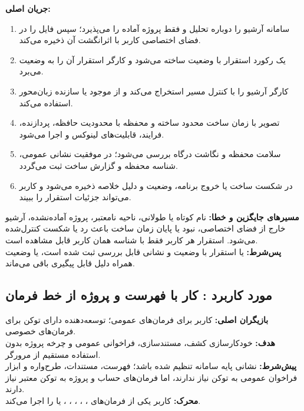 
\noindent\textbf{جریان اصلی:}
\begin{enumerate}
  \item سامانه آرشیو را دوباره تحلیل و فقط پروژه آماده را می‌پذیرد؛ سپس فایل را در فضای اختصاصی کاربر با اثرانگشت آن ذخیره می‌کند.
  \item یک رکورد استقرار با وضعیت  ساخته می‌شود و کارگر استقرار آن را به وضعیت  می‌برد.
  \item کارگر آرشیو را با کنترل مسیر استخراج می‌کند و از  موجود یا سازنده زبان‌محور استفاده می‌کند.
  \item تصویر با زمان ساخت محدود ساخته و محفظه با محدودیت حافظه، پردازنده، فرایند، قابلیت‌های لینوکس و  اجرا می‌شود.
  \item سلامت محفظه و نگاشت درگاه بررسی می‌شود؛ در موفقیت نشانی عمومی، شناسه محفظه و گزارش ساخت ثبت می‌گردد.
  \item در شکست ساخت یا خروج برنامه، وضعیت  و دلیل خلاصه ذخیره می‌شود و کاربر می‌تواند جزئیات استقرار را ببیند.
\end{enumerate}

\noindent\textbf{مسیرهای جایگزین و خطا:}
نام کوتاه یا طولانی، ناحیه نامعتبر، پروژه آماده‌نشده، آرشیو خارج از فضای اختصاصی، نبود  یا پایان زمان ساخت باعث رد یا شکست کنترل‌شده می‌شود. استقرار هر کاربر فقط با شناسه همان کاربر قابل مشاهده است.\\
\textbf{پس‌شرط:} یا استقرار با وضعیت  و نشانی قابل بررسی ثبت شده است، یا وضعیت  همراه دلیل قابل پیگیری باقی می‌ماند.

\UseCaseStart
\subsection{مورد کاربرد : کار با فهرست و پروژه از خط فرمان}
\noindent\textbf{بازیگران اصلی:} کاربر  برای فرمان‌های عمومی؛ توسعه‌دهنده دارای توکن برای فرمان‌های خصوصی.\\
\textbf{هدف:} خودکارسازی کشف، مستندسازی، فراخوانی عمومی و چرخه پروژه بدون استفاده مستقیم از مرورگر.\\
\textbf{پیش‌شرط:} نشانی پایه سامانه تنظیم شده باشد؛ فهرست، مستندات، طرح‌واره و ابزار فراخوان عمومی به توکن نیاز ندارند، اما فرمان‌های حساب و پروژه به توکن معتبر نیاز دارند.\\
\textbf{محرک:} کاربر یکی از فرمان‌های ، ، ، ، ،  یا  را اجرا می‌کند.

